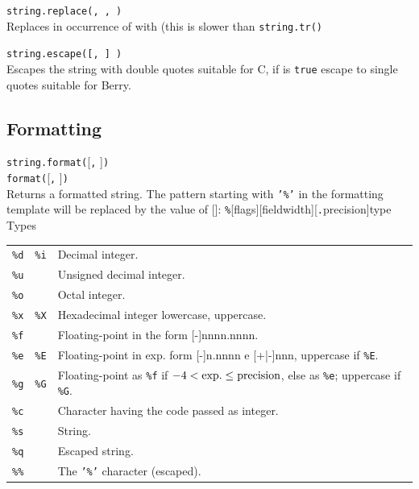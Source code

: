 \hangpar \texttt{string.replace(}\texttt{, }\texttt{, }\texttt{)}\\
Replaces in  occurrence of  with  (this is slower than \texttt{string.tr()}

\hangpar \texttt{string.escape(}\texttt{[, }\texttt{] )}\\
Escapes the string with double quotes suitable for C, if  is \texttt{true} escape to single quotes suitable for Berry.

\subsection*{Formatting}

\hangpartwo \texttt{string.format(}[\texttt{,} ]\texttt{)}\\
\texttt{format(}[\texttt{,} ]\texttt{)}\\
Returns a formatted string. The pattern starting with \texttt{'\%'} in the formatting template  will be replaced by the value of []: \texttt{\%}[\textsf{flags}][\textsf{fieldwidth}][\texttt{.}\textsf{precision}]\textsf{type}\\

\hangpar \textsf{Types}\\
\begin{tabular}{@{}llp{}}
    \texttt{\%d} & \texttt{\%i} & Decimal integer. \\
    \texttt{\%u} & & Unsigned decimal integer. \\
    \texttt{\%o} & & Octal integer. \\
    \texttt{\%x} & \texttt{\%X} & Hexadecimal integer lowercase, uppercase. \\
    \texttt{\%f} & & Floating-point in the form [-]nnnn.nnnn. \\
    \texttt{\%e} & \texttt{\%E} & Floating-point in exp. form [-]n.nnnn e [+|-]nnn,
    uppercase if \texttt{\%E}. \\
    \texttt{\%g} & \texttt{\%G} & Floating-point as \texttt{\%f} if $-4<\rm{exp.}\leq precision$, else as \texttt{\%e}; uppercase if \texttt{\%G}. \\
    \texttt{\%c} & & Character having the code passed as integer. \\
    \texttt{\%s} & & String. \\
    \texttt{\%q} & & Escaped string. \\
    \texttt{\%\%} & & The \texttt{'\%'} character (escaped). \\
\end{tabular}\\

